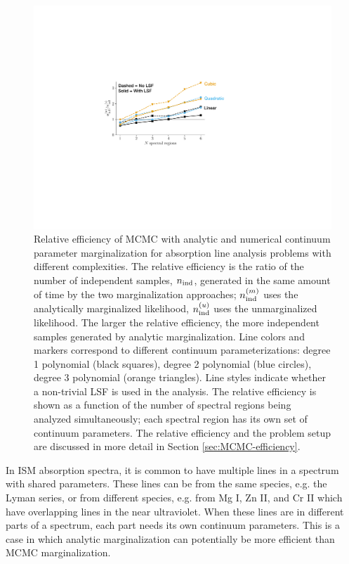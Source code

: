 \documentclass[manuscript]{aastex62}
\begin{document}
{\begin{figure}
  \includegraphics{efficiency.pdf}
  \caption{
  Relative efficiency of MCMC with analytic and numerical continuum parameter marginalization for absorption line analysis problems with different complexities.
  The relative efficiency is the ratio of the number of independent samples, $n_{\rm ind}$, generated in the same amount of time by the two marginalization approaches; $n_{\rm ind}^{(m)}$ uses the analytically marginalized likelihood, $n_{\rm ind}^{(u)}$ uses the unmarginalized likelihood.
  The larger the relative efficiency, the more independent samples generated by analytic marginalization.
  Line colors and markers correspond to different continuum parameterizations: degree 1 polynomial (black squares), degree 2 polynomial (blue circles), degree 3 polynomial (orange triangles).
  Line styles indicate whether a non-trivial LSF is used in the analysis.
  The relative efficiency is shown as a function of the number of spectral regions being analyzed simultaneously; each spectral region has its own set of continuum parameters.
  The relative efficiency and the problem setup are discussed in more detail in Section \ref{sec:MCMC-efficiency}.
  }
  \label{fig:efficiency-comparison}
\end{figure}

In ISM absorption spectra, it is common to have multiple lines in a spectrum with shared parameters.
These lines can be from the same species, e.g. the Lyman series, or from different species, e.g. from Mg {\tiny I}, Zn {\tiny II}, and Cr {\tiny II} which have overlapping lines in the near ultraviolet.
When these lines are in different parts of a spectrum, each part needs its own continuum parameters.
This is a case in which analytic marginalization can potentially be more efficient than MCMC marginalization.

}
\end{document}
